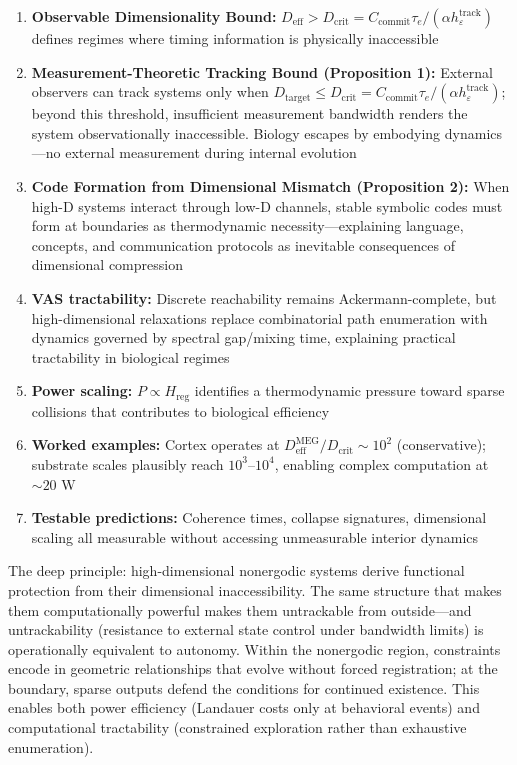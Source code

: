 \documentclass[12pt]{article}
\begin{document}
\begin{enumerate}
\item \textbf{Observable Dimensionality Bound:} $D_{\text{eff}} > D_{\text{crit}} = C_{\text{commit}}\tau_e/(\alpha h_\varepsilon^{\text{track}})$ defines regimes where timing information is physically inaccessible

\item \textbf{Measurement-Theoretic Tracking Bound (Proposition 1):} External observers can track systems only when $D_{\text{target}} \le D_{\text{crit}} = C_{\text{commit}}\tau_e/(\alpha h_\varepsilon^{\text{track}})$; beyond this threshold, insufficient measurement bandwidth renders the system observationally inaccessible. Biology escapes by embodying dynamics—no external measurement during internal evolution

\item \textbf{Code Formation from Dimensional Mismatch (Proposition 2):} When high-D systems interact through low-D channels, stable symbolic codes must form at boundaries as thermodynamic necessity---explaining language, concepts, and communication protocols as inevitable consequences of dimensional compression

\item \textbf{VAS tractability:} Discrete reachability remains Ackermann-complete, but high-dimensional relaxations replace combinatorial path enumeration with dynamics governed by spectral gap/mixing time, explaining practical tractability in biological regimes

\item \textbf{Power scaling:} $P \propto H_{\text{reg}}$ identifies a thermodynamic pressure toward sparse collisions that contributes to biological efficiency

\item \textbf{Worked examples:} Cortex operates at $D_{\text{eff}}^{\text{MEG}}/D_{\text{crit}} \sim 10^{2}$ (conservative); substrate scales plausibly reach $10^3$--$10^4$, enabling complex computation at $\sim 20$ W

\item \textbf{Testable predictions:} Coherence times, collapse signatures, dimensional scaling all measurable without accessing unmeasurable interior dynamics
\end{enumerate}

The deep principle: high-dimensional nonergodic systems derive functional protection from their dimensional inaccessibility. The same structure that makes them computationally powerful makes them untrackable from outside---and untrackability (resistance to external state control under bandwidth limits) is operationally equivalent to autonomy. Within the nonergodic region, constraints encode in geometric relationships that evolve without forced registration; at the boundary, sparse outputs defend the conditions for continued existence. This enables both power efficiency (Landauer costs only at behavioral events) and computational tractability (constrained exploration rather than exhaustive enumeration).
\end{document}
